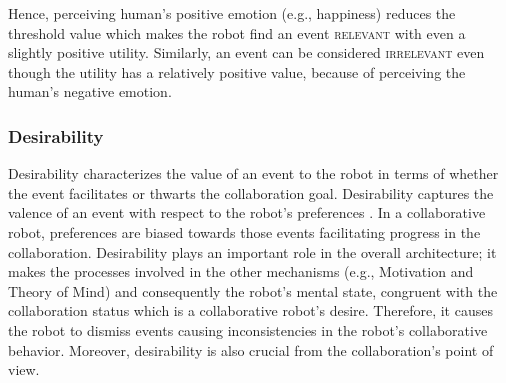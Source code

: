 Hence, perceiving human's positive emotion (e.g., happiness) reduces the
threshold value which makes the robot find an event \textsc{relevant} with even
a slightly positive utility. Similarly, an event can be considered
\textsc{irrelevant} even though the utility has a relatively positive value,
because of perceiving the human's negative emotion.

\subsubsection{Desirability}

Desirability characterizes the value of an event to the robot in terms of
whether the event facilitates or thwarts the collaboration goal. Desirability
captures the valence of an event with respect to the robot's preferences
\cite{gratch:domain-independent}. In a collaborative robot, preferences are
biased towards those events facilitating progress in the collaboration.
Desirability plays an important role in the overall architecture; it makes the
processes involved in the other mechanisms (e.g., Motivation and Theory of
Mind) and consequently the robot's mental state, congruent with the
collaboration status which is a collaborative robot's desire. Therefore, it
causes the robot to dismiss events causing inconsistencies in the robot's
collaborative behavior. Moreover, desirability is also crucial from the
collaboration's point of view.


